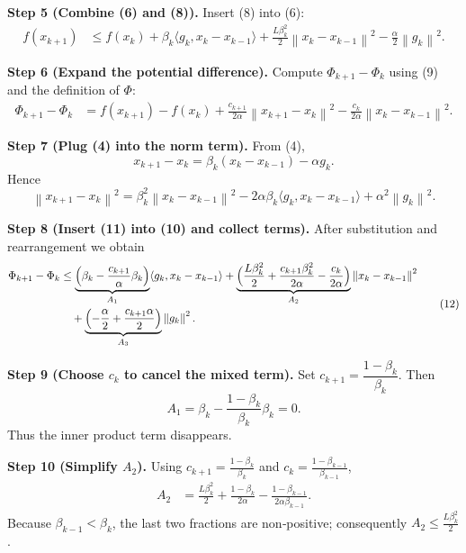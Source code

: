 \documentclass{article}
\newcommand{\norm}[1]{\left\lVert #1\right\rVert}
\begin{document}
\noindent\textbf{Step 5 (Combine (6) and (8)).}  
Insert (8) into (6):
\[
\begin{aligned}
f(x_{k+1})
&\le f(x_k) + \beta_k\langle g_k, x_k-x_{k-1}\rangle
   + \frac{L\beta_k^2}{2}\norm{x_k-x_{k-1}}^2
   - \frac{\alpha}{2}\norm{g_k}^2 .
\end{aligned}
\tag{9}
\]

\noindent\textbf{Step 6 (Expand the potential difference).}  
Compute $\Phi_{k+1}-\Phi_k$ using (9) and the definition of $\Phi$:
\[
\begin{aligned}
\Phi_{k+1}-\Phi_k
&= f(x_{k+1})-f(x_k)
   + \frac{c_{k+1}}{2\alpha}\norm{x_{k+1}-x_k}^2
   - \frac{c_k}{2\alpha}\norm{x_k-x_{k-1}}^2 .
\end{aligned}
\tag{10}
\]

\noindent\textbf{Step 7 (Plug (4) into the norm term).}  
From (4),
\[
x_{k+1}-x_k = \beta_k (x_k-x_{k-1}) - \alpha g_k .
\]
Hence
\[
\norm{x_{k+1}-x_k}^2
= \beta_k^2\norm{x_k-x_{k-1}}^2
   -2\alpha\beta_k\langle g_k, x_k-x_{k-1}\rangle
   +\alpha^2\norm{g_k}^2 .
\tag{11}
\]

\noindent\textbf{Step 8 (Insert (11) into (10) and collect terms).}  
After substitution and rearrangement we obtain
\[
\begin{aligned}
\Phi_{k+1}-\Phi_k
&\le
   \underbrace{\Bigl(\beta_k - \frac{c_{k+1}}{\alpha}\beta_k\Bigr)}_{A_1}
   \langle g_k, x_k-x_{k-1}\rangle
   + \underbrace{\Bigl(\frac{L\beta_k^2}{2}
                + \frac{c_{k+1}\beta_k^2}{2\alpha}
                - \frac{c_k}{2\alpha}\Bigr)}_{A_2}
      \norm{x_k-x_{k-1}}^2 \\
&\quad
   + \underbrace{\Bigl(-\frac{\alpha}{2}
                + \frac{c_{k+1}\alpha}{2}\Bigr)}_{A_3}
      \norm{g_k}^2 .
\end{aligned}
\tag{12}
\]

\noindent\textbf{Step 9 (Choose $c_k$ to cancel the mixed term).}  
Set $c_{k+1}= \dfrac{1-\beta_k}{\beta_k}$.
Then
\[
A_1 = \beta_k - \frac{1-\beta_k}{\beta_k}\beta_k =0 .
\tag{13}
\]
Thus the inner product term disappears.

\noindent\textbf{Step 10 (Simplify $A_2$).}  
Using $c_{k+1}=\frac{1-\beta_k}{\beta_k}$ and $c_k=\frac{1-\beta_{k-1}}{\beta_{k-1}}$,
\[
\begin{aligned}
A_2 &= \frac{L\beta_k^2}{2}
     + \frac{1-\beta_k}{2\alpha}
     - \frac{1-\beta_{k-1}}{2\alpha\beta_{k-1}} .
\end{aligned}
\tag{14}
\]
Because $\beta_{k-1}<\beta_k$, the last two fractions are non‑positive; consequently $A_2\le \frac{L\beta_k^2}{2}$.
\end{document}
